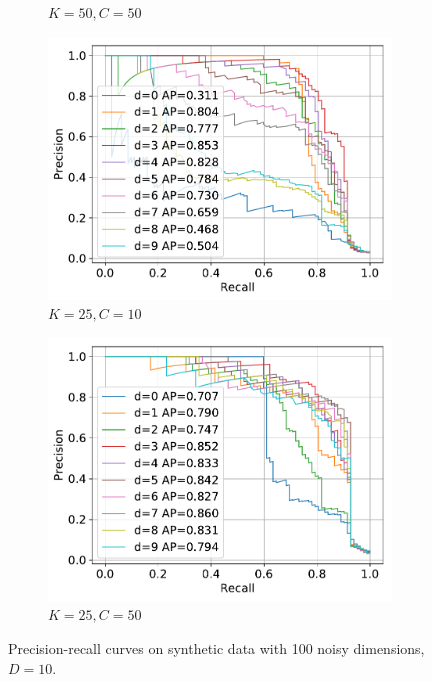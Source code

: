 \documentclass[11pt,onecolumn]{article}
\begin{document}
\begin{figure}[h!]
\begin{subfigure}[t]{0.24\textwidth}
        \caption{$K=50, C=50$}
    \end{subfigure}
		\hfill
    \begin{subfigure}[t]{0.24\textwidth}
        \centering
        \includegraphics[width=\linewidth]{fig/chains_pr_k25c10d10.pdf}
        \caption{$K=25, C=10$}
    \end{subfigure}
		\hfill
    \begin{subfigure}[t]{0.24\textwidth}
        \centering
        \includegraphics[width=\linewidth]{fig/chains_pr_k25c50d10.pdf}
        \caption{$K=25, C=50$}
    \end{subfigure}
    \caption{Precision-recall curves on synthetic data with 100 noisy dimensions, $D=10$.}
\end{figure}
\end{document}
